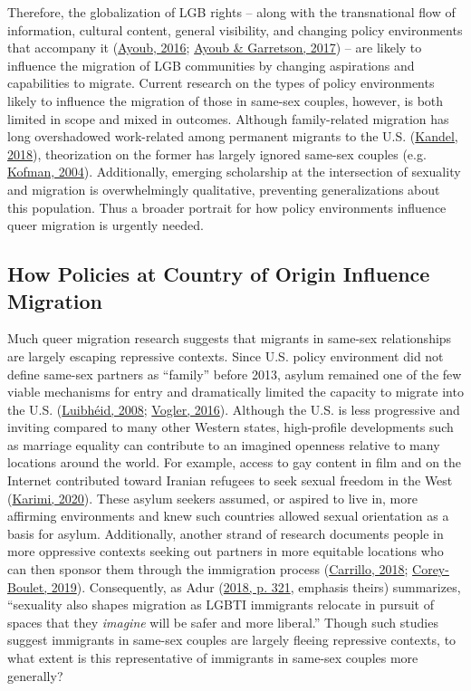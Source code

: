 \documentclass[
  11pt,
]{article}
\begin{document}
Therefore, the globalization of LGB rights -- along with the transnational flow of information, cultural content, general visibility, and changing policy environments that accompany it (\protect\hyperlink{ref-ayoub_2016}{Ayoub, 2016}; \protect\hyperlink{ref-ayoub_2017}{Ayoub \& Garretson, 2017}) -- are likely to influence the migration of LGB communities by changing aspirations and capabilities to migrate. Current research on the types of policy environments likely to influence the migration of those in same-sex couples, however, is both limited in scope and mixed in outcomes. Although family-related migration has long overshadowed work-related among permanent migrants to the U.S. (\protect\hyperlink{ref-kandel_2018_familybased}{Kandel, 2018}), theorization on the former has largely ignored same-sex couples (e.g. \protect\hyperlink{ref-kofman_2004_family}{Kofman, 2004}). Additionally, emerging scholarship at the intersection of sexuality and migration is overwhelmingly qualitative, preventing generalizations about this population.
Thus a broader portrait for how policy environments influence queer migration is urgently needed.

\hypertarget{how-policies-at-country-of-origin-influence-migration}{%
\subsection{How Policies at Country of Origin Influence Migration}\label{how-policies-at-country-of-origin-influence-migration}}

Much queer migration research suggests that migrants in same-sex relationships are largely escaping repressive contexts. Since U.S. policy environment did not define same-sex partners as ``family'' before 2013, asylum remained one of the few viable mechanisms for entry and dramatically limited the capacity to migrate into the U.S. (\protect\hyperlink{ref-luibheid_2008}{Luibhéid, 2008}; \protect\hyperlink{ref-vogler_2016}{Vogler, 2016}). Although the U.S. is less progressive and inviting compared to many other Western states, high-profile developments such as marriage equality can contribute to an imagined openness relative to many locations around the world. For example, access to gay content in film and on the Internet contributed toward Iranian refugees to seek sexual freedom in the West (\protect\hyperlink{ref-karimi_2020}{Karimi, 2020}). These asylum seekers assumed, or aspired to live in, more affirming environments and knew such countries allowed sexual orientation as a basis for asylum. Additionally, another strand of research documents people in more oppressive contexts seeking out partners in more equitable locations who can then sponsor them through the immigration process (\protect\hyperlink{ref-carrillo_2018}{Carrillo, 2018}; \protect\hyperlink{ref-corey-boulet_2019}{Corey-Boulet, 2019}). Consequently, as Adur (\protect\hyperlink{ref-adur_2018}{2018, p. 321}, emphasis theirs) summarizes, ``sexuality also shapes migration as LGBTI immigrants relocate in pursuit of spaces that they \emph{imagine} will be safer and more liberal.'' Though such studies suggest immigrants in same-sex couples are largely fleeing repressive contexts, to what extent is this representative of immigrants in same-sex couples more generally?
\end{document}
